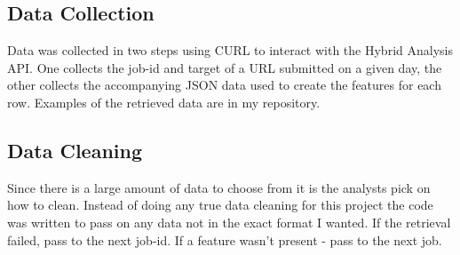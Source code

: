 \documentclass[conference]{IEEEtran}
\begin{document}
\subsection{Data Collection}
Data was collected in two steps using CURL to interact with the Hybrid Analysis API. One collects the job-id and target of a URL submitted on a given day, the other collects the accompanying JSON data used to create the features for each row. Examples of the retrieved data are in my repository.

\subsection{Data Cleaning}
Since there is a large amount of data to choose from it is the analysts pick on how to clean. Instead of doing any true data cleaning for this project the code was written to pass on any data not in the exact format I wanted. If the retrieval failed, pass to the next job-id. If a feature wasn't present - pass to the next job.
\end{document}
